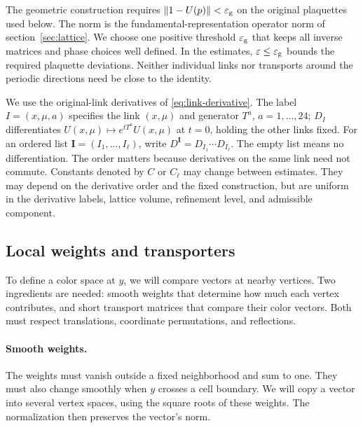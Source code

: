 \documentclass[11pt,a4paper]{article}
\theoremstyle{remark}
\newcommand{\eps}{\varepsilon}
\begin{document}
The geometric construction requires
$\|1-U(p)\|<\eps_{\rm g}$ on the original plaquettes used below.
The norm is the fundamental-representation operator norm of
section~\ref{sec:lattice}. We choose one positive threshold $\eps_{\rm g}$
that keeps all inverse matrices and phase choices well defined. In the
estimates, $\eps\le\eps_{\rm g}$ bounds the required plaquette deviations.
Neither individual links nor transports around the periodic directions
need be close to the identity.

We use the original-link derivatives of \eqref{eq:link-derivative}.
The label $I=(x,\mu,a)$ specifies the link $(x,\mu)$ and generator
$T^a$, $a=1,\ldots,24$; $D_I$ differentiates
$U(x,\mu)\mapsto e^{tT^a}U(x,\mu)$ at $t=0$, holding the other
links fixed. For an ordered list $\boldsymbol I=(I_1,\ldots,I_\ell)$,
write $D^{\boldsymbol I}=D_{I_1}\cdots D_{I_\ell}$. The empty list
means no differentiation. The order matters because derivatives on the
same link need not commute. Constants denoted by $C$ or $C_\ell$ may
change between estimates. They may depend on the derivative order and the fixed construction,
but are uniform in the derivative labels, lattice volume, refinement
level, and admissible component.

\subsection{Local weights and transporters}
\label{app:g:weights}

To define a color space at $y$, we will compare vectors at nearby
vertices. Two ingredients are needed: smooth weights that determine how
much each vertex contributes, and short transport matrices that compare
their color vectors. Both must respect translations, coordinate
permutations, and reflections.

\paragraph{Smooth weights.}
The weights must vanish outside a fixed neighborhood and sum to one.
They must also change smoothly when $y$ crosses a cell boundary. We will
copy a vector into several vertex spaces, using the square roots of
these weights. The normalization then preserves the vector's norm.
\end{document}
